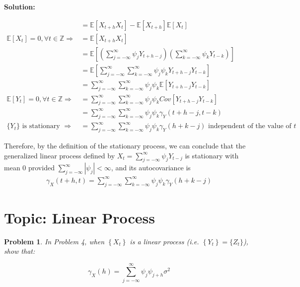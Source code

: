\documentclass[11pt]{article}
\theoremstyle{plain} %
\newtheorem{problem}[theorem]{Problem}
\newenvironment{solution}
{\color{C2}\normalfont\begin{framed}\begingroup\textbf{Solution:} }
  {\endgroup\end{framed}}
\theoremstyle{remark}
\newcommand{\EE}{\mathbb{E}}
\begin{document}
\begin{solution}
\begin{enumerate}[label=(\roman*)]
{\begin{align*}
			                        & = \EE[X_{t+h}X_{t}] - \EE[X_{t+h}]\EE[X_{t}]                                                                                        \\
			      \EE[X_{t}] = 0, \forall t\in\mathbb{Z}\Longrightarrow
			                        & = \EE[X_{t+h}X_{t}]                                                                                                                 \\
			                        & = \EE\left[\left(\sum_{j=-\infty}^{\infty} \psi_{j} Y_{t+h-j}\right) \left(\sum_{k=-\infty}^{\infty} \psi_{k} Y_{t-k}\right)\right] \\
			                        & = \EE\left[\sum_{j=-\infty}^{\infty}\sum_{k=-\infty}^{\infty} \psi_{j} \psi_{k}Y_{t+h-j}Y_{t-k}\right]                              \\
			                        & = \sum_{j=-\infty}^{\infty}\sum_{k=-\infty}^{\infty} \psi_{j} \psi_{k}\EE\left[Y_{t+h-j}Y_{t-k}\right]                              \\
			      \EE[Y_{t}] = 0, \forall t\in \mathbb{Z} \Longrightarrow
			                        & = \sum_{j=-\infty}^{\infty}\sum_{k=-\infty}^{\infty} \psi_{j} \psi_{k}Cov[Y_{t+h-j}Y_{t-k}]                                         \\
			                        & = \sum_{j=-\infty}^{\infty}\sum_{k=-\infty}^{\infty} \psi_{j} \psi_{k}\gamma_{Y}(t+h-j, t-k)                                        \\
			      \{Y_{t}\} \text{ is stationary } \Longrightarrow
			                        & = \sum_{j=-\infty}^{\infty}\sum_{k=-\infty}^{\infty} \psi_{j} \psi_{k}\gamma_{Y}(h+k-j) \text{ independent of the value of } t
		      \end{align*}
		      }\end{enumerate}
	Therefore, by the definition of the stationary process, we can conclude that the generalized linear process defined by $X_{t}=\sum_{j=-\infty}^{\infty} \psi_{j} Y_{t-j}$ is stationary with mean $0$ provided $\sum_{j=-\infty}^{\infty}\left|\psi_{j}\right|<\infty$, and its autocovariance is
	\begin{align}
		\gamma_{X}(t+h,t) = \sum_{j=-\infty}^{\infty}\sum_{k=-\infty}^{\infty} \psi_{j} \psi_{k}\gamma_{Y}(h+k-j) \label{eq:generalized linear process autocovariance}
	\end{align}
\end{solution}

\section{Topic: Linear Process}
\begin{problem}
In Problem 4, when $\left\{X_{t}\right\}$ is a linear process (i.e. $\left\{Y_{t}\right\}=\{Z_t\}$), show that:

$$
	\gamma_{X}(h)=\sum_{j=-\infty}^{\infty} \psi_{j} \psi_{j+h} \sigma^{2}
$$
\end{problem}
\end{document}
